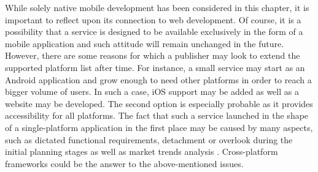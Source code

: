 While solely native mobile development has been considered in this chapter, it is important to reflect upon its connection to web development. Of course, it is a possibility that a service is designed to be available exclusively in the form of a mobile application and such attitude will remain unchanged in the future. However, there are some reasons for which a publisher may look to extend the supported platform list after time. For instance, a small service may start as an Android application and grow enough to need other platforms in order to reach a bigger volume of users. In such a case, iOS support may be added as well as a website may be developed. The second option is especially probable as it provides accessibility for all platforms. The fact that such a service launched in the shape of a single-platform application in the first place may be caused by many aspects, such as dictated functional requirements, detachment or overlook during the initial planning stages as well as market trends analysis \cite{web_mobile_app}. Cross-platform frameworks could be the answer to the above-mentioned issues.
